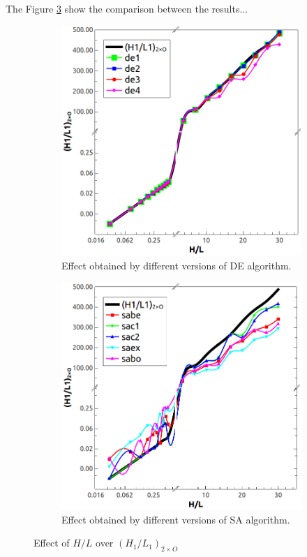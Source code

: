 \documentclass[10pt,fleqn,a4paper,twoside]{article}
\begin{document}
The Figure \ref{figure07} show the comparison between the results...

\begin{figure}[h!]
\centering
	\begin{subfigure}{0.52\textwidth}
		\centering
		\includegraphics[width=1\linewidth]{imgs/5dof/de/g_hl_h1l1_1.png}
		\caption{ {\small Effect obtained by different versions of DE algorithm.}}
		\label{figure07:sub1}
	\end{subfigure}%
	\begin{subfigure}{0.52\textwidth}
		\centering
		\includegraphics[width=1\linewidth]{imgs/5dof/sa/g_hl_h1l1_1.png}
		\caption{ {\small Effect obtained by different versions of SA algorithm.}}
		\label{figure07:sub2}
	\end{subfigure}%
\caption{Effect of $H/L$ over ${(H_{1}/L_{1})_{2\times O}}$}
\label{figure07}
\end{figure}
\end{document}
